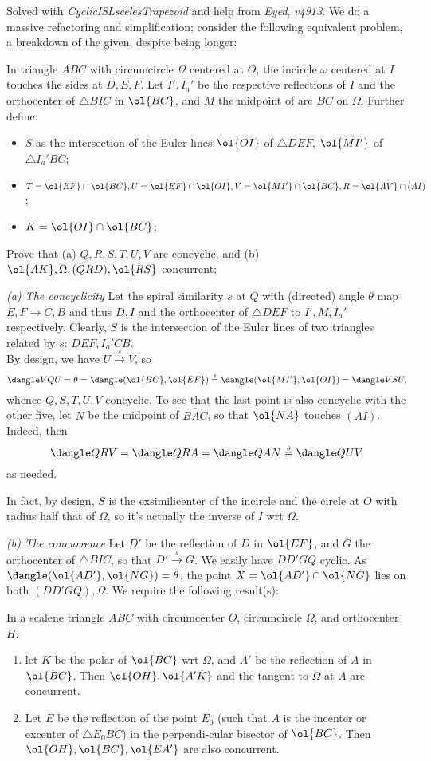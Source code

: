 \documentclass{seto}
\begin{document}
Solved with \emph{CyclicISLscelesTrapezoid} and help from \emph{Eyed}, \emph{v4913}. 
We do a massive refactoring and simplification; consider the following equivalent problem, a breakdown of the given, despite being longer: 
\begin{block} 
In triangle $ABC$ with circumcircle $\Omega$ centered at $O$, the incircle
$\omega$ centered at $I$ touches the sides at $D,E,F$. Let $I',I_a'$ be the
respective reflections of $I$ and the orthocenter of $\triangle BIC$ in
$\ol{BC}$, and $M$ the midpoint of arc $BC$ on $\Omega$. Further define: 
\begin{itemize} 
\item $S$ as the intersection of the Euler lines $\ol{OI}$ of $\triangle DEF$, $\ol{MI'}$ of $\triangle I_a'BC$; 
\item $T=\ol{EF}\cap\ol{BC}, U=\ol{EF}\cap\ol{OI}, V=\ol{MI'}\cap\ol{BC},R=\ol{AV}\cap (AI)$; \item $K=\ol{OI}\cap\ol{BC}$; 
\end{itemize}
Prove that (a) $Q,R,S,T,U,V$ are concyclic, and (b) $\ol{AK},\Omega,(QRD), \ol{RS}$ concurrent; 
\end{block} 
\emph{(a) The concyclicity} Let the spiral similarity $s$ at $Q$ with (directed)
angle $\theta$ map $E,F\to C,B$ and thus $D,I$ and the orthocenter of $\triangle
DEF$ to $I',M,I_a'$ respectively. Clearly, $S$ is the intersection of the Euler
lines of two triangles related by $s$: $DEF,I_a'CB$.\\ 
By design, we have $U\overset s\to V$, so 
\[\dangle VQU=\theta=\dangle(\ol{BC},\ol{EF})\overset s=\dangle(\ol{MI'},\ol{OI})=\dangle VSU,\] 
whence $Q,S,T,U,V$ concyclic. To see that the last point is also concyclic with
the other five, let $N$ be the midpoint of $\widehat{BAC}$, so that $\ol{NA}$
touches $(AI)$. Indeed, then \[\dangle QRV=\dangle QRA=\dangle QAN\overset
s=\dangle QUV\] 
as needed. 
\begin{remark}In fact, by design, $S$ is the exsimilicenter of the incircle and
the circle at $O$ with radius half that of $\Omega$, so it's actually the
inverse of $I$ wrt $\Omega$.\end{remark} 
\emph{(b) The concurrence} Let $D'$ be the reflection of $D$ in $\ol{EF}$, and $G$ the orthocenter of $\triangle BIC$,
so that $D'\overset s\to G$. We easily have $DD'GQ$ cyclic. As
$\dangle(\ol{AD'},\ol{NG})=\theta$, the point $X=\ol{AD'}\cap\ol{NG}$ lies on
both $(DD'GQ), \Omega$. We require the following result(s): 
\begin{thm} In a scalene triangle $ABC$ with circumcenter $O$, circumcircle $\Omega$, and orthocenter $H$. 
\begin{enumerate}[label=(\alph*)] 
\item let $K$ be the polar of $\ol{BC}$ wrt $\Omega$, and $A'$ be the reflection
of $A$ in $\ol{BC}$. Then $\ol{OH},\ol{A'K}$ and the tangent to $\Omega$ at $A$
are concurrent. 
\item Let $E$ be the reflection of the point $E_0$ (such that $A$ is the
incenter or excenter of $\triangle E_0BC$) in the perpendi-cular bisector of
$\ol{BC}$. Then $\ol{OH},\ol{BC},\ol{EA'}$ are also concurrent. 
\end{enumerate}
\end{thm} 
\end{document}
